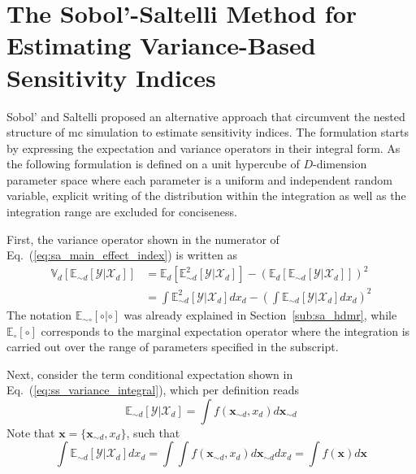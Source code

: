 \section{The Sobol'-Saltelli Method for Estimating Variance-Based Sensitivity Indices}\label{app:sobol_saltelli}

Sobol' \cite{Sobol2001} and Saltelli \cite{Saltelli2002} proposed an alternative approach that circumvent the nested structure of \gls{mc} simulation to estimate sensitivity indices.
The formulation starts by expressing the expectation and variance operators in their integral form.
As the following formulation is defined on a unit hypercube of $D$-dimension parameter space where each parameter is a uniform and independent random variable,
explicit writing of the distribution within the integration as well as the integration range are excluded for conciseness.

First, the variance operator shown in the numerator of Eq.~(\ref{eq:sa_main_effect_index}) is written as
\begin{equation}
  \begin{split}
    \mathbb{V}_{d}[\mathbb{E}_{\sim d}[\mathcal{Y}|\mathcal{X}_d]] & = \mathbb{E}_{d}[\mathbb{E}_{\sim d}^{2}[\mathcal{Y}|\mathcal{X}_d]] - \left(\mathbb{E}_{d}[\mathbb{E}_{\sim d}[\mathcal{Y}|\mathcal{X}_d]]\right)^2 \\ 
                                               & = \int \mathbb{E}_{\sim d}^{2}[\mathcal{Y}|\mathcal{X}_d] dx_d - \left(\int \mathbb{E}_{\sim d}[\mathcal{Y}|\mathcal{X}_d] dx_d\right)^2
  \end{split}
\label{eq:ss_variance_integral}
\end{equation}
The notation $\mathbb{E}_{\sim \circ}[\circ | \circ]$ was already explained in Section~\ref{sub:sa_hdmr}, 
while $\mathbb{E}_{\circ} [\circ]$ corresponds to the marginal expectation operator 
where the integration is carried out over the range of parameters specified in the subscript. 

Next, consider the term conditional expectation shown in Eq.~(\ref{eq:ss_variance_integral}), which per definition reads
\begin{equation}
  \mathbb{E}_{\sim d} [\mathcal{Y}|\mathcal{X}_d] = \int f(\bm{x}_{\sim d}, x_d) d\bm{x}_{\sim d}
\label{eq:ss_expectation_integral}
\end{equation}
Note that $\bm{x} = \{\bm{x}_{\sim d}, x_d\}$, such that
\begin{equation}
  \int \mathbb{E}_{\sim d} [\mathcal{Y}|\mathcal{X}_d] dx_d = \int \int f(\bm{x}_{\sim d}, x_d) d\bm{x}_{\sim d} dx_{d} = \int f(\bm{x}) d\bm{x}
\label{eq:ss_expectation_expectation}
\end{equation}

